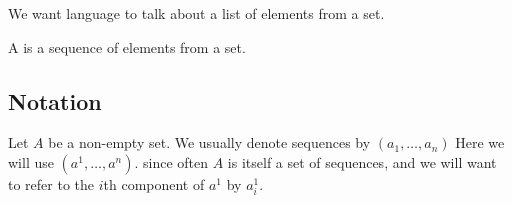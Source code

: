 
\sbasic








\sstart
{}


We want language to talk about
a list of elements from a set.


A  is a sequence
of elements from a set.

\subsection{Notation}

Let $A$ be a non-empty set.
We usually denote sequences
by $(a_1, \dots, a_n)$
Here we will use
$(a^1, \dots, a^n)$.
since often $A$ is itself
a set of sequences,
and we will want to refer
to the $i$th component of
$a^1$ by $a^1_i$.


\strats
